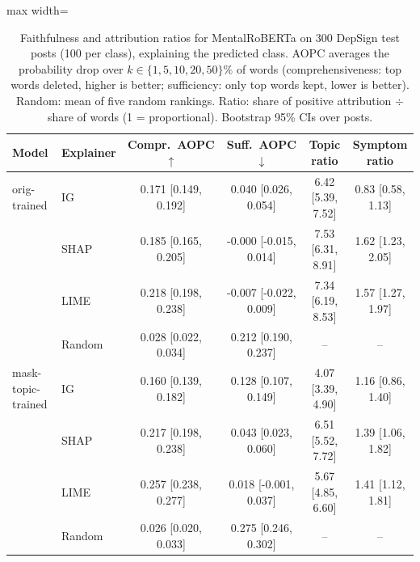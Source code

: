 \begin{table}[t]
\centering
\caption{Faithfulness and attribution ratios for MentalRoBERTa on 300 DepSign test posts (100 per class), explaining the predicted class. AOPC averages the probability drop over $k\in\{1,5,10,20,50\}\%$ of words (comprehensiveness: top words deleted, higher is better; sufficiency: only top words kept, lower is better). Random: mean of five random rankings. Ratio: share of positive attribution $\div$ share of words (1 = proportional). Bootstrap 95\% CIs over posts.}\label{tab:xai}
\scriptsize
\setlength{\tabcolsep}{3pt}
\begin{adjustbox}{max width=\textwidth}
\begin{tabular}{llcccc}
\toprule
Model & Explainer & Compr.\ AOPC $\uparrow$ & Suff.\ AOPC $\downarrow$ & Topic ratio & Symptom ratio \\
\midrule
orig-trained & IG & 0.171 \tiny[0.149, 0.192] & 0.040 \tiny[0.026, 0.054] & 6.42 \tiny[5.39, 7.52] & 0.83 \tiny[0.58, 1.13] \\
 & SHAP & 0.185 \tiny[0.165, 0.205] & -0.000 \tiny[-0.015, 0.014] & 7.53 \tiny[6.31, 8.91] & 1.62 \tiny[1.23, 2.05] \\
 & LIME & 0.218 \tiny[0.198, 0.238] & -0.007 \tiny[-0.022, 0.009] & 7.34 \tiny[6.19, 8.53] & 1.57 \tiny[1.27, 1.97] \\
 & Random & 0.028 \tiny[0.022, 0.034] & 0.212 \tiny[0.190, 0.237] & -- & -- \\
\addlinespace[2pt]
mask-topic-trained & IG & 0.160 \tiny[0.139, 0.182] & 0.128 \tiny[0.107, 0.149] & 4.07 \tiny[3.39, 4.90] & 1.16 \tiny[0.86, 1.40] \\
 & SHAP & 0.217 \tiny[0.198, 0.238] & 0.043 \tiny[0.023, 0.060] & 6.51 \tiny[5.52, 7.72] & 1.39 \tiny[1.06, 1.82] \\
 & LIME & 0.257 \tiny[0.238, 0.277] & 0.018 \tiny[-0.001, 0.037] & 5.67 \tiny[4.85, 6.60] & 1.41 \tiny[1.12, 1.81] \\
 & Random & 0.026 \tiny[0.020, 0.033] & 0.275 \tiny[0.246, 0.302] & -- & -- \\
\bottomrule
\end{tabular}
\end{adjustbox}
\end{table}
